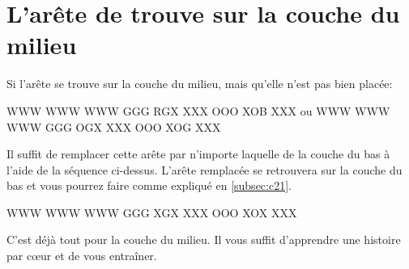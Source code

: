 \newpage
\section{L'arête de trouve sur la couche du milieu}

Si l'arête se trouve sur la couche du milieu, mais qu'elle n'est pas bien placée:
\smallskip

\begin{center}
	
	\RubikFaceUp%
	{W}{W}{W}%
	{W}{W}{W}%
	{W}{W}{W}
	\RubikFaceRight%
	{G}{G}{G}%
	{R}{G}{X}%
	{X}{X}{X}
	\RubikFaceFront%
	{O}{O}{O}%
	{X}{O}{B}%
	{X}{X}{X}
	\hspace*{5mm}ou\hspace*{3mm} 	
	\RubikFaceUp%
	{W}{W}{W}%
	{W}{W}{W}%
	{W}{W}{W}
	\RubikFaceRight%
	{G}{G}{G}%
	{O}{G}{X}%
	{X}{X}{X}
	\RubikFaceFront%
	{O}{O}{O}%
	{X}{O}{G}%
	{X}{X}{X}
\end{center}
\smallskip

Il suffit de remplacer cette arête par n'importe laquelle de la couche du bas à l'aide de la séquence ci-dessus. L'arête remplacée se retrouvera sur la couche du bas et vous pourrez faire comme expliqué en \ref{subsec:c21}.

\smallskip
\begin{center}	
	\RubikFaceUp%
	{W}{W}{W}%
	{W}{W}{W}%
	{W}{W}{W}
	\RubikFaceRight%
	{G}{G}{G}%
	{X}{G}{X}%
	{X}{X}{X}
	\RubikFaceFront%
	{O}{O}{O}%
	{X}{O}{X}%
	{X}{X}{X}
\end{center}
\smallskip

C'est déjà tout pour la couche du milieu. Il vous suffit d'apprendre une histoire par cœur et de vous entraîner.
